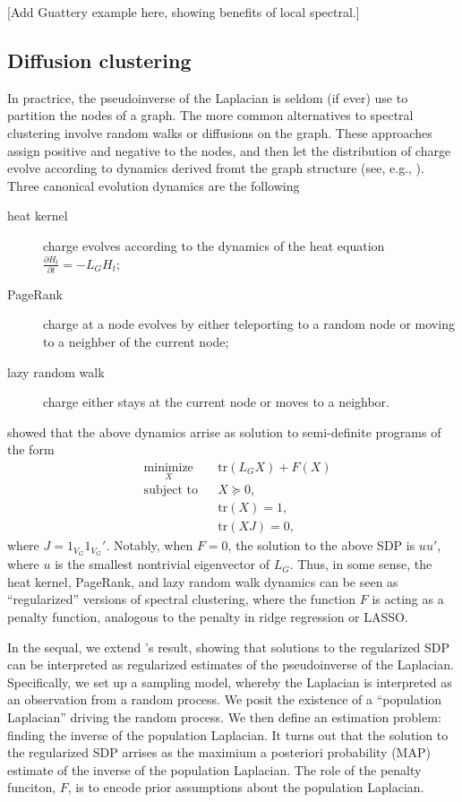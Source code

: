 \documentclass[12pt]{article}
\theoremstyle{plain}
\begin{document}
[Add Guattery example here, showing benefits of local spectral.]


\subsection{Diffusion clustering}

In practrice, the pseudoinverse of the Laplacian is seldom (if ever)
use to partition the nodes of a graph.  The more common alternatives
to spectral clustering involve random walks or diffusions on the
graph.  These approaches assign positive and negative to the nodes,
and then let the distribution of charge evolve according to dynamics
derived fromt the graph structure (see, e.g., \citet{andersen2006local}).
Three canonical evolution dynamics are the following
\begin{description}
  \item[heat kernel]
    charge evolves according to the dynamics of the heat equation
    $\frac{\partial H_t}{\partial t} = - L_G H_t$;
  \item[PageRank]
    charge at a node evolves by either teleporting to a random node or moving
    to a neighber of the current node;
  \item[lazy random walk]
    charge either stays at the current node or moves to a neighbor.
\end{description}
\citet{mahoney2010implementing} showed that the above dynamics arrise
as solution to semi-definite programs of the form
\[
\begin{aligned}
  & \underset{X}{\text{minimize}}
  & & \mathrm{tr}(L_G X) + F(X) \\
  & \text{subject to}
  & & X \succeq 0, \\
  & & & \mathrm{tr}(X) = 1, \\
  & & & \mathrm{tr}(X J) = 0,
\end{aligned}
\]
where $J = 1_{V_G} 1_{V_G}'$.  Notably, when $F = 0$, the solution
to the above SDP is $u u'$, where $u$ is the smallest nontrivial
eigenvector of $L_G$.  Thus, in some sense, the heat kernel, PageRank,
and lazy random walk dynamics can be seen as ``regularized'' versions
of spectral clustering, where the function $F$ is acting as a penalty
function, analogous to the penalty in ridge regression or LASSO.

In the sequal, we extend 's
result, showing that solutions to the regularized SDP can be
interpreted as regularized estimates of the pseudoinverse of the
Laplacian.  Specifically, we set up a sampling model, whereby the
Laplacian is interpreted as an observation from a random process.  We
posit the existence of a ``population Laplacian'' driving the random
process.  We then define an estimation problem: finding the inverse of
the population Laplacian.  It turns out that the solution to the
regularized SDP arrises as the maximium a posteriori probability (MAP)
estimate of the inverse of the population Laplacian.  The role of the
penalty funciton, $F$, is to encode prior assumptions about the
population Laplacian.
\end{document}
